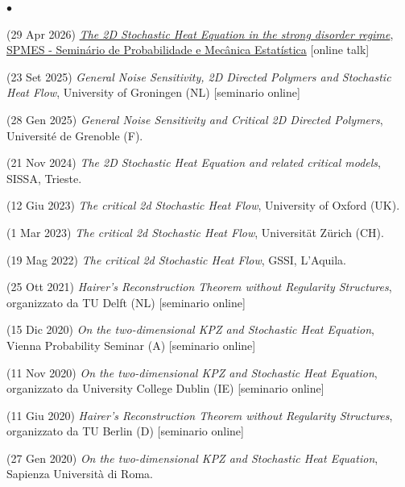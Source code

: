 \documentclass[a4paper,11pt,oneside]{amsart}
\newenvironment{myitemize}{%
\begin{list}{$\bullet$}%
 	{%
	\setlength{\itemsep}{0.3em}%
	\setlength{\topsep}{0.3em}%
	\setlength{\partopsep}{0em}%
	\setlength{\parsep}{0em}%
	\setlength{\parskip}{0em}%
	\setlength\leftmargin{1.5em}%
	\setlength\labelwidth{1.1em}%
	\setlength{\labelsep}{0.4em}%
	}%
	}%
{\end{list}}
\renewenvironment{itemize}{
\begin{myitemize}}%
{\end{myitemize}}
\begin{document}
\begin{itemize}
\item (29 Apr 2026)
\href{https://www.youtube.com/watch?v=Sr_MR2VmlfI}{\emph{The 2D Stochastic Heat Equation in the strong disorder regime}},
\href{https://spmes.impa.br/}{SPMES - Seminário de Probabilidade e Mecânica Estatística} [online talk]

\item (23 Set 2025)
\emph{General Noise Sensitivity, 2D Directed Polymers and Stochastic Heat Flow},
University of Groningen (NL) [seminario online]

\item (28 Gen 2025)
\emph{General Noise Sensitivity and Critical 2D Directed Polymers},
Université de Grenoble (F).

\item (21 Nov 2024)
\emph{The 2D Stochastic Heat Equation and related critical models},
SISSA, Trieste.

\item (12 Giu 2023)
\emph{The critical 2d Stochastic Heat Flow},
University of Oxford (UK).

\item (1 Mar 2023)
\emph{The critical 2d Stochastic Heat Flow},
Universit\"at Z\"urich (CH).

\item (19 Mag 2022)
\emph{The critical 2d Stochastic Heat Flow},
GSSI, L'Aquila.

\item (25 Ott 2021)
\emph{Hairer's Reconstruction Theorem without Regularity Structures},
organizzato da TU Delft (NL) [seminario online]

\item (15 Dic 2020)
\emph{On the two-dimensional KPZ and Stochastic Heat Equation},
Vienna Probability Seminar (A) [seminario online] 

\item (11 Nov 2020)
\emph{On the two-dimensional KPZ and Stochastic Heat Equation},
organizzato da University College Dublin (IE) [seminario online]

\item (11 Giu 2020)
\emph{Hairer's Reconstruction Theorem without Regularity Structures},
organizzato da TU Berlin (D) [seminario online]

\item (27 Gen 2020)
\emph{On the two-dimensional KPZ and Stochastic Heat Equation},
Sapienza Università di Roma.


\end{itemize}
\end{document}
